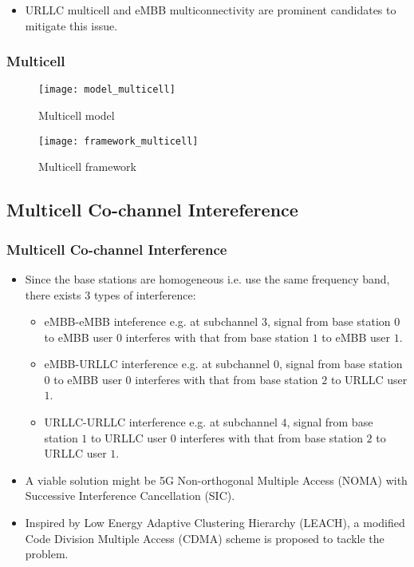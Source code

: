 \begin{frame}
  \begin{itemize}
    \item URLLC multicell and eMBB multiconnectivity are prominent candidates to mitigate this issue.
  \end{itemize}
\end{frame}

\begin{frame}
  \frametitle{Multicell}
  \begin{figure}
    \texttt{[image: model\_multicell]}
    \caption{Multicell model}
  \end{figure}
\end{frame}

\begin{frame}
  \begin{figure}
    \texttt{[image: framework\_multicell]}
    \caption{Multicell framework}
  \end{figure}
\end{frame}

\subsection{Multicell Co-channel Intereference}
\begin{frame}
  \frametitle{Multicell Co-channel Interference}
  \begin{itemize}
    \item Since the base stations are homogeneous i.e. use the same frequency band, there exists 3 types of interference:
      \begin{itemize}
        \item eMBB-eMBB inteference e.g. at subchannel $3$, signal from base station $0$ to eMBB user $0$ interferes with that from base station $1$ to eMBB user $1$.
        \item eMBB-URLLC interference e.g. at subchannel $0$, signal from base station $0$ to eMBB user $0$ interferes with that from base station $2$ to URLLC user $1$.
        \item URLLC-URLLC interference e.g. at subchannel $4$, signal from base station $1$ to URLLC user $0$ interferes with that from base station $2$ to URLLC user $1$.
      \end{itemize}
  \end{itemize}
\end{frame}

\begin{frame}
  \begin{itemize}
    \item A viable solution might be 5G Non-orthogonal Multiple Access (NOMA) with Successive Interference Cancellation (SIC). %
    \item Inspired by Low Energy Adaptive Clustering Hierarchy (LEACH), a modified Code Division Multiple Access (CDMA) scheme is proposed to tackle the problem\exampleFootnote.
  \end{itemize}
\end{frame}

